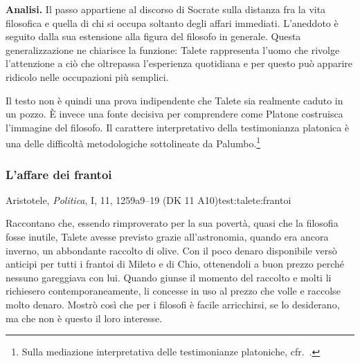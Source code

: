 

\noindent\textbf{Analisi.}
Il passo appartiene al discorso di Socrate sulla distanza fra la vita filosofica e quella di chi si occupa soltanto degli affari immediati. L'aneddoto è seguito dalla sua estensione alla figura del filosofo in generale. Questa generalizzazione ne chiarisce la funzione: Talete rappresenta l'uomo che rivolge l'attenzione a ciò che oltrepassa l'esperienza quotidiana e per questo può apparire ridicolo nelle occupazioni più semplici.

Il testo non è quindi una prova indipendente che Talete sia realmente caduto in un pozzo. È invece una fonte decisiva per comprendere come Platone costruisca l'immagine del filosofo. Il carattere interpretativo della testimonianza platonica è una delle difficoltà metodologiche sottolineate da Palumbo.\footnote{Sulla mediazione interpretativa delle testimonianze platoniche, cfr.\ \cite[17]{palumbo2015}.}

\subsubsection{L'affare dei frantoi}

\begin{testimonianza}{Aristotele, \emph{Politica}, I, 11, 1259a9--19 (DK 11 A10)}{test:talete:frantoi}
\smallskip
{}\par
Raccontano che, essendo rimproverato per la sua povertà, quasi che la filosofia fosse inutile, Talete avesse previsto grazie all'astronomia, quando era ancora inverno, un abbondante raccolto di olive. Con il poco denaro disponibile versò anticipi per tutti i frantoi di Mileto e di Chio, ottenendoli a buon prezzo perché nessuno gareggiava con lui. Quando giunse il momento del raccolto e molti li richiesero contemporaneamente, li concesse in uso al prezzo che volle e raccolse molto denaro. Mostrò così che per i filosofi è facile arricchirsi, se lo desiderano, ma che non è questo il loro interesse.
\end{testimonianza}

